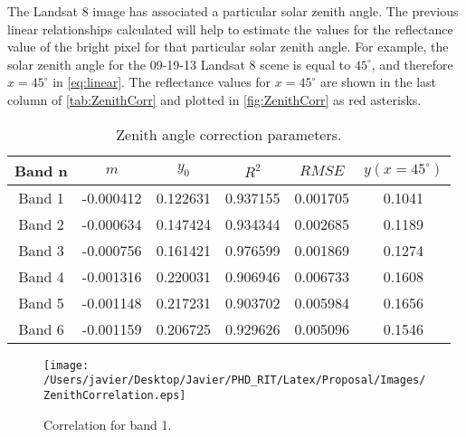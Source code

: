 The Landsat 8 image has associated a particular solar zenith angle. The previous linear relationships calculated will help to estimate the values for the reflectance value of the bright pixel for that particular solar zenith angle. For example, the solar zenith angle for the 09-19-13 Landsat 8 scene is equal to $45^\circ$, and therefore $x=45^\circ$ in \autoref{eq:linear}. The reflectance values for $x=45^\circ$ are shown in the last column of \autoref{tab:ZenithCorr} and plotted in \autoref{fig:ZenithCorr} as red asterisks.
\begin{table}[htb]
\caption{ Zenith angle correction parameters. \label{tab:ZenithCorr} } 
\centering
\begin{tabular}{c|c|c|c|c|c} 
 \bfseries{Band n} & \bfseries{$m$}      & \bfseries{$y_0$}    & \bfseries{$R^2$}     & \bfseries{$RMSE$} & $y(x=45^\circ)$   \\ \hline \hline
 Band 1 & -0.000412 & 0.122631 & 0.937155 & 0.001705 &  0.1041\\
 Band 2 & -0.000634 & 0.147424 & 0.934344 & 0.002685 &  0.1189\\
 Band 3 & -0.000756 & 0.161421 & 0.976599 & 0.001869 &  0.1274\\
 Band 4 & -0.001316 & 0.220031 & 0.906946 & 0.006733 &  0.1608\\
 Band 5 & -0.001148 & 0.217231 & 0.903702 & 0.005984 &  0.1656\\
 Band 6 & -0.001159 & 0.206725 & 0.929626 & 0.005096 &  0.1546\\  
 \end{tabular}
\end{table}

\begin{figure}[htb]
  	\centering
  	\texttt{[image: /Users/javier/Desktop/Javier/PHD\_RIT/Latex/Proposal/Images/ZenithCorrelation.eps]}
  \caption{Correlation for band 1. \label{fig:Band1Corr} } 
\end{figure}

